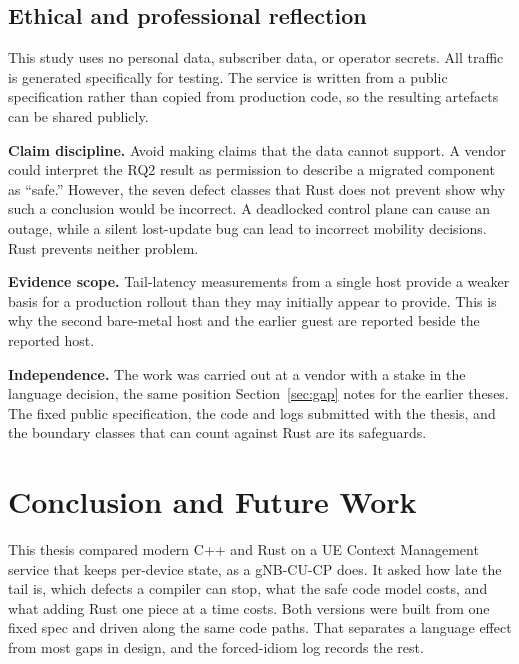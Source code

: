 \documentclass[english,oneside,a4paper,censored,csm,software-track-2020]{HYthesisML}
\begin{document}
\section{Ethical and professional reflection}
This study uses no personal data, subscriber data, or operator secrets. All
traffic is generated specifically for testing. The service is written from a
public specification rather than copied from production code, so the resulting
artefacts can be shared publicly.

\begin{compactitem}
\item \textbf{Claim discipline.} Avoid making claims that the data cannot support. A vendor
could interpret the RQ2 result as permission to describe a migrated component as ``safe.''
However, the seven defect classes that Rust does not prevent show why such a conclusion would
be incorrect. A deadlocked control plane can cause an outage, while a silent lost-update bug
can lead to incorrect mobility decisions. Rust prevents neither problem.

\item \textbf{Evidence scope.} Tail-latency measurements from a single host provide a weaker
basis for a production rollout than they may initially appear to provide. This is why the
second bare-metal host and the earlier guest are reported beside the reported host.

\item \textbf{Independence.} The work was carried out at a vendor with a stake in the language
decision, the same position Section~\ref{sec:gap} notes for the earlier theses. The fixed
public specification, the code and logs submitted with the thesis, and the boundary classes
that can count against Rust are its safeguards.
\end{compactitem}

\chapter{Conclusion and Future Work\label{chapter:conclusions}}

This thesis compared modern C++ and Rust on a UE Context Management service
that keeps per-device state, as a gNB-CU-CP does. It asked how late the tail
is, which defects a compiler can stop, what the safe code model costs, and what
adding Rust one piece at a time costs. Both versions were built from one fixed
spec and driven along the same code paths. That separates a language effect from
most gaps in design, and the forced-idiom log records the rest.
\end{document}
